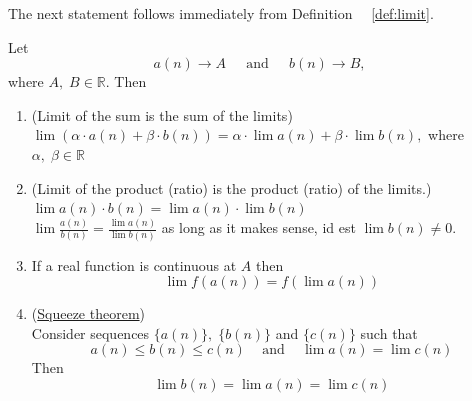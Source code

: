 \documentclass[color=black,11pt]{elegantpaper}
\begin{document}
 The next statement follows immediately from Definition ~~\ref{def:limit}.
\begin{theorem}
Let
$$
a(n) \to A\;\;\;\;\mbox{ and }\;\;\;\;b(n) \to B,
$$ 
where $A,\;B\in \mathbb{R}.$
Then
\begin{enumerate}
\item (Limit of the sum is the sum of the limits)\\
$\lim (\alpha \cdot a(n) + \beta \cdot b(n)) = \alpha \cdot \lim a(n) +  \beta \cdot  \lim b(n),$ where $\alpha ,\;\beta \in \mathbb{R}$
\item (Limit of the product (ratio) is the product (ratio) of the limits.)\\
$\lim a(n)\cdot b(n) = \lim a(n) \cdot \lim b(n)$\\
$\lim \frac{a(n)}{b(n)} =  \frac{\lim a(n)}{ \lim b(n)}$ as long as it makes sense, id est $\lim b(n) \not= 0.$
\item If a real function is continuous at $A$ then
$$
\lim f(a(n)) = f(\lim a(n))
$$
\item (\href{https://en.wikipedia.org/wiki/Squeeze_theorem}{Squeeze theorem})\\
Consider sequences $\{a(n)\},\;\{b(n)\}$ and $\{c(n)\}$ such that
$$
a(n) \le b(n) \le c(n)\;\;\;\mbox{ and }\;\;\; \lim a(n) = \lim c(n) 
$$
Then
$$
\lim b(n) = \lim a(n) = \lim c(n) 
$$
\end{enumerate}
\end{theorem}
\end{document}
